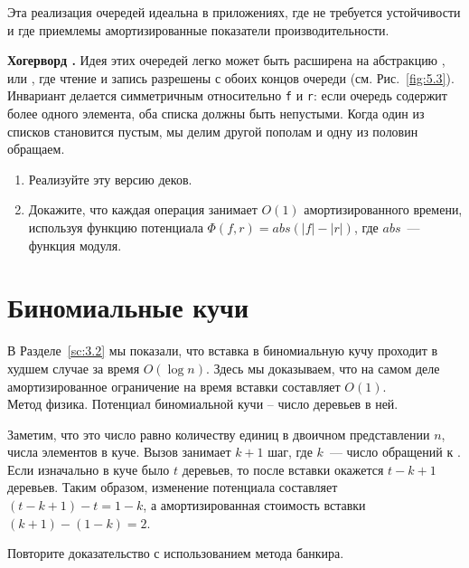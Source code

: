 \begin{frame}[fragile]{}
\begin{hint}
  Эта реализация очередей идеальна в приложениях, где не требуется
  устойчивости и где приемлемы амортизированные показатели
  производительности.
\end{hint}

\end{frame}

\ifanswers
\begin{frame}[fragile]{}
\begin{exercise}\label{ex:5.1}
  \textbf{Хогерворд \cite{Hoogerwoord1992}.}  Идея этих очередей легко
  может быть расширена на абстракцию , или , где чтение и запись разрешены с
  обоих концов очереди (см. Рис.~\ref{fig:5.3}). Инвариант делается
  симметричным относительно \lstinline!f! и \lstinline!r!: если
  очередь содержит более одного элемента, оба списка должны быть
  непустыми. Когда один из списков становится пустым, мы делим другой
  пополам и одну из половин обращаем.
  
  \begin{enumerate}
    \item Реализуйте эту версию деков.
    \item Докажите, что каждая операция занимает $O(1)$ амортизированного
    времени, используя функцию потенциала $\Phi(f,r) = abs(|f| -
    |r|)$, где $abs$~--- функция модуля.
  \end{enumerate}
\end{exercise}
\end{frame}
\fi

\section{Биномиальные кучи}
\label{sc:5.3}


\begin{frame}[fragile]{}
В Разделе~\ref{sc:3.2} мы показали, что вставка в биномиальную кучу
проходит в худшем случае за время $O(\log n)$. Здесь мы доказываем,
что на самом деле амортизированное ограничение на время вставки
составляет $O(1)$.\\

Метод физика. Потенциал биномиальной кучи -- число деревьев в ней. 

Заметим, что это число равно количеству
единиц в двоичном представлении $n$, числа элементов в куче.  Вызов
 занимает $k+1$ шаг, где $k$~--- число обращений к
. Если изначально в куче было $t$ деревьев, то после
вставки окажется $t - k + 1$ деревьев. Таким образом, изменение
потенциала составляет $(t - k + 1) - t = 1 - k$, а амортизированная
стоимость вставки $(k + 1) - (1 - k) = 2$.\\

\begin{exercise}\label{ex:5.2}
  Повторите доказательство с использованием метода банкира.
\end{exercise}

\end{frame}



